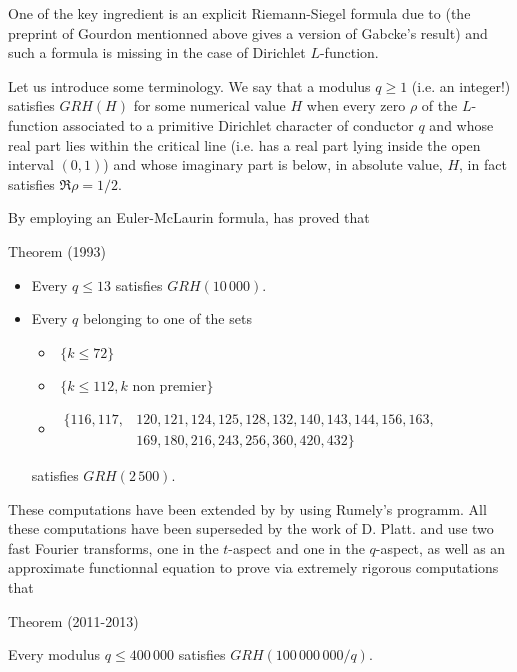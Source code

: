 One of the key ingredient is an explicit Riemann-Siegel formula due to
\cite{Gabcke*79}
(the preprint of Gourdon mentionned above gives a version of Gabcke's result)
and such a formula is missing in the case of Dirichlet $L$-function.

Let us introduce some terminology. We say that a modulus $q\ge1$ (i.e. an
integer!) satisfies $GRH(H)$ for some numerical value $H$ when
every zero $\rho$ of the $L$-function associated to a primitive Dirichlet
character of conductor $q$ and whose real part lies within the critical line (i.e. has a
real part lying inside the open interval $(0,1)$) and whose imaginary part is
below, in absolute value, $H$, in fact satisfies $\Re\rho=1/2$.

By employing an Euler-McLaurin formula,
\cite{Rumely*93}
has proved that

\begin{thm}{Theorem (1993)}

  \begin{itemize}
  \item Every $q\le 13$ satisfies $GRH(10\,000)$.

  \item Every $q$ belonging to one of the sets
  \begin{itemize}
    \item \,\,$\{k\le 72\}$

    \item \,\,$\{k\le 112, \text{$k$ non premier}\}$

    \item \,$\begin{aligned}\{116, 117, &120, 121, 124, 125, 128, 132, 140,
     143, 144, 156, 163, \\ &169, 180, 216, 243, 256, 360, 420, 432\}\end{aligned}$

    \end{itemize}
    satisfies $GRH(2\,500)$.
    

    \end{itemize}
\end{thm}

These computations have been extended by 
\cite{Bennett*01}
by using Rumely's programm. All these computations have been
superseded by the work of D. Platt.
\cite{Platt*11} and
\cite{Platt*13}
use two fast Fourier transforms, one in the $t$-aspect and one in the
$q$-aspect, as well as an approximate functionnal equation to prove via
extremely rigorous computations that
\begin{thm}{Theorem (2011-2013)}

  Every modulus $q\le 400\,000$ satisfies
    $GRH(100\,000\,000/q)$.
\end{thm}


